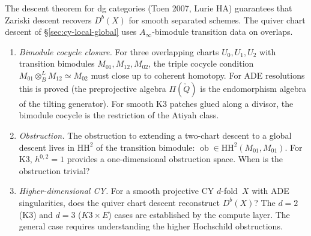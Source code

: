 
\begin{openproblem}
\label{op:programme-h-descent}
The descent theorem for dg categories (Toen 2007, Lurie HA)
guarantees that Zariski descent recovers $D^b(X)$ for smooth
separated schemes. The quiver chart descent of
\S\ref{sec:cy-local-global} uses $A_\infty$-bimodule transition
data on overlaps.
\begin{enumerate}[label=\textup{(H\arabic*)}]
\item \emph{Bimodule cocycle closure.} For three overlapping
 charts $U_0, U_1, U_2$ with transition bimodules
 $M_{01}, M_{12}, M_{02}$, the triple cocycle condition
 $M_{01} \otimes^L_B M_{12} \simeq M_{02}$ must close up
 to coherent homotopy. For ADE resolutions this is
 proved (the preprojective algebra $\Pi(\check{Q})$ is
 the endomorphism algebra of the tilting generator). For
 smooth K3 patches glued along a divisor, the bimodule
 cocycle is the restriction of the Atiyah class.
\item \emph{Obstruction.} The obstruction to extending a
 two-chart descent to a global descent lives in
 $\mathrm{HH}^2$ of the transition bimodule:
 $\operatorname{ob} \in
 \mathrm{HH}^2(M_{01}, M_{01})$. For K3, $h^{0,2} = 1$
 provides a one-dimensional obstruction space. When is
 the obstruction trivial?
\item \emph{Higher-dimensional CY.} For a smooth projective
 CY $d$-fold~$X$ with ADE singularities, does the quiver
 chart descent reconstruct $D^b(X)$? The $d = 2$ (K3)
 and $d = 3$ ($K3 \times E$) cases are established by
 the compute layer. The general case requires understanding
 the higher Hochschild obstructions.
\end{enumerate}
\end{openproblem}




